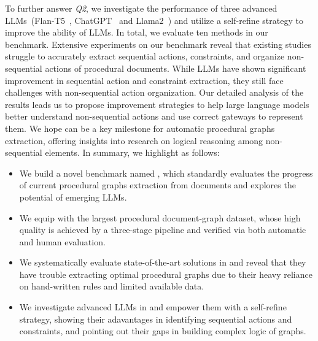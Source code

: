 To further answer \textit{Q2}, we investigate the performance of three advanced LLMs~(Flan-T5~\cite{chung2022scaling}, ChatGPT~\cite{ouyang2022training} and Llama2~\cite{touvron2023llama}) and utilize a self-refine strategy to improve the ability of LLMs. In total, we evaluate ten methods in our \benchmark benchmark. Extensive experiments on our benchmark reveal that existing studies struggle to accurately extract sequential actions, constraints, and organize non-sequential actions of procedural documents. While LLMs have shown significant improvement in sequential action and constraint extraction, they still face challenges with non-sequential action organization. Our detailed analysis of the results leads us to propose improvement strategies to help large language models better understand non-sequential actions and use correct gateways to represent them. We hope \benchmark can be a key milestone for automatic procedural graphs extraction, offering insights into research on logical reasoning among non-sequential elements.
In summary, we highlight \benchmark as follows:
%
\begin{itemize}
    \item We build a novel benchmark named \benchmark, which standardly evaluates the progress of current procedural graphs extraction from documents and explores the potential of emerging LLMs.
    \item We equip \benchmark with the largest procedural document-graph dataset, whose high quality is achieved by a three-stage pipeline and verified via both automatic and human evaluation.
    \item We systematically evaluate state-of-the-art solutions in \benchmark and reveal that they have trouble extracting optimal procedural graphs due to their heavy reliance on hand-written rules and limited available data.
    \item We investigate advanced LLMs in \benchmark and empower them with a self-refine strategy, showing their adavantages in identifying sequential actions and constraints, and pointing out their gaps in building complex logic of graphs.
\end{itemize}
